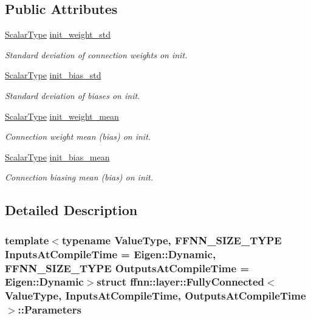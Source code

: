\subsection*{Public Attributes}
\begin{DoxyCompactItemize}
\item 
\hyperlink{classffnn_1_1layer_1_1_fully_connected_ac3ff6f72846f84f89c0d6e10f138c7e3}{Scalar\-Type} \hyperlink{structffnn_1_1layer_1_1_fully_connected_1_1_parameters_af6ab8d97825d77b4cc2d6b4a4870759d}{init\-\_\-weight\-\_\-std}
\begin{DoxyCompactList}\small\item\em Standard deviation of connection weights on init. \end{DoxyCompactList}\item 
\hyperlink{classffnn_1_1layer_1_1_fully_connected_ac3ff6f72846f84f89c0d6e10f138c7e3}{Scalar\-Type} \hyperlink{structffnn_1_1layer_1_1_fully_connected_1_1_parameters_a9e925704885ce05e37fb6bf53a1c57c4}{init\-\_\-bias\-\_\-std}
\begin{DoxyCompactList}\small\item\em Standard deviation of biases on init. \end{DoxyCompactList}\item 
\hyperlink{classffnn_1_1layer_1_1_fully_connected_ac3ff6f72846f84f89c0d6e10f138c7e3}{Scalar\-Type} \hyperlink{structffnn_1_1layer_1_1_fully_connected_1_1_parameters_abd0d7b7f6e7220ece91db3f9ab3812be}{init\-\_\-weight\-\_\-mean}
\begin{DoxyCompactList}\small\item\em Connection weight mean (bias) on init. \end{DoxyCompactList}\item 
\hyperlink{classffnn_1_1layer_1_1_fully_connected_ac3ff6f72846f84f89c0d6e10f138c7e3}{Scalar\-Type} \hyperlink{structffnn_1_1layer_1_1_fully_connected_1_1_parameters_ada734ee2cffa841b4502f10c834571ba}{init\-\_\-bias\-\_\-mean}
\begin{DoxyCompactList}\small\item\em Connection biasing mean (bias) on init. \end{DoxyCompactList}\end{DoxyCompactItemize}


\subsection{Detailed Description}
\subsubsection*{template$<$typename Value\-Type, F\-F\-N\-N\-\_\-\-S\-I\-Z\-E\-\_\-\-T\-Y\-P\-E Inputs\-At\-Compile\-Time = Eigen\-::\-Dynamic, F\-F\-N\-N\-\_\-\-S\-I\-Z\-E\-\_\-\-T\-Y\-P\-E Outputs\-At\-Compile\-Time = Eigen\-::\-Dynamic$>$struct ffnn\-::layer\-::\-Fully\-Connected$<$ Value\-Type, Inputs\-At\-Compile\-Time, Outputs\-At\-Compile\-Time $>$\-::\-Parameters}

